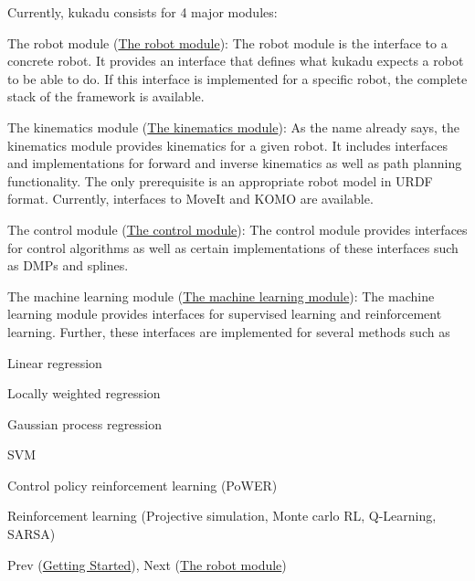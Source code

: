 Currently, kukadu consists for 4 major modules\-:
\begin{DoxyItemize}
\item The robot module (\hyperlink{robotpage}{The robot module})\-: The robot module is the interface to a concrete robot. It provides an interface that defines what kukadu expects a robot to be able to do. If this interface is implemented for a specific robot, the complete stack of the framework is available.
\item The kinematics module (\hyperlink{kinematicspage}{The kinematics module})\-: As the name already says, the kinematics module provides kinematics for a given robot. It includes interfaces and implementations for forward and inverse kinematics as well as path planning functionality. The only prerequisite is an appropriate robot model in U\-R\-D\-F format. Currently, interfaces to Move\-It and K\-O\-M\-O are available.
\item The control module (\hyperlink{controlpage}{The control module})\-: The control module provides interfaces for control algorithms as well as certain implementations of these interfaces such as D\-M\-Ps and splines.
\item The machine learning module (\hyperlink{mlpage}{The machine learning module})\-: The machine learning module provides interfaces for supervised learning and reinforcement learning. Further, these interfaces are implemented for several methods such as
\begin{DoxyItemize}
\item Linear regression
\item Locally weighted regression
\item Gaussian process regression
\item S\-V\-M
\item Control policy reinforcement learning (Po\-W\-E\-R)
\item Reinforcement learning (Projective simulation, Monte carlo R\-L, Q-\/\-Learning, S\-A\-R\-S\-A)
\end{DoxyItemize}
\end{DoxyItemize}

Prev (\hyperlink{gettingstartedpage}{Getting Started}), Next (\hyperlink{robotpage}{The robot module}) 
